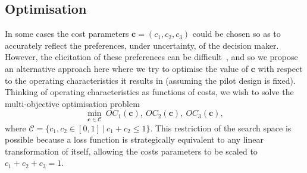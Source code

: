 \documentclass{article} %
\begin{document}
%

\subsection{Optimisation}\label{sec:optimisation}

In some cases the cost parameters $\mathbf{c} = (c_1, c_2, c_3)$ could be chosen so as to accurately reflect the preferences, under uncertainty, of the decision maker. However, the elicitation of these preferences can be difficult~\cite{Keeney1976}, and so we propose an alternative approach here where we try to optimise the value of $\mathbf{c}$ with respect to the operating characteristics it results in (assuming the pilot design is fixed). Thinking of operating characteristics as functions of costs, we wish to solve the multi-objective optimisation problem
\begin{equation}\label{eqn:opt}
\min_{\mathbf{c} \in \mathcal{C}} ~ OC_{1}(\mathbf{c}),~ OC_{2}(\mathbf{c}),~ OC_{3}(\mathbf{c}),
\end{equation}
where $\mathcal{C} = \{c_{1}, c_{2} \in [0,1] ~|~ c_{1} + c_{2} \leq 1\}$. This restriction of the search space is possible because a loss function is strategically equivalent to any linear transformation of itself, allowing the costs parameters to be scaled to $c_{1} + c_{2} + c_{3} = 1$. 
\end{document}
